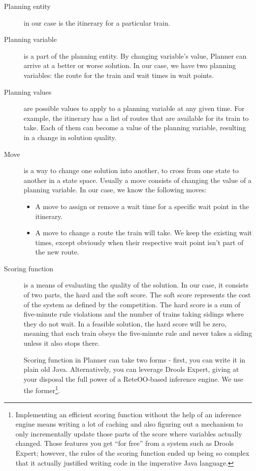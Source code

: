 \documentclass[10pt,a4paper,final]{article}
\begin{document}
\begin{description}
\item[Planning entity] in our case is the itinerary for a particular train.

\item[Planning variable] is a part of the planning entity. By changing variable's value, Planner can arrive at a better or worse solution. In our case, we have two planning variables: the route for the train and wait times in wait points.

\item[Planning values] are possible values to apply to a planning variable at any given time. For example, the itinerary has a list of routes that are available for its train to take. Each of them can become a value of the planning variable, resulting in a change in solution quality.

\item[Move] is a way to change one solution into another, to cross from one state to another in a state space. Usually a move consists of changing the value of a planning variable. In our case, we know the following moves:

\begin{itemize}
\item A move to assign or remove a wait time for a specific wait point in the itinerary.
\item A move to change a route the train will take. We keep the existing wait times, except obviously when their respective wait point isn't part of the new route.
\end{itemize}

\item[Scoring function] is a means of evaluating the quality of the solution. In our case, it consists of two parts, the hard and the soft score. The soft score represents the cost of the system as defined by the competition. The hard score is a sum of five-minute rule violations and the number of trains taking sidings where they do not wait. In a feasible solution, the hard score will be zero, meaning that each train obeys the five-minute rule and never takes a siding unless it also stops there.

Scoring function in Planner can take two forms - first, you can write it in plain old Java. Alternatively, you can leverage Drools Expert, giving at your disposal the full power of a ReteOO-based inference engine. We use the former\footnote{Implementing an efficient scoring function without the help of an inference engine means writing a lot of caching and also figuring out a mechanism to only incrementally update those parts of the score where variables actually changed. Those features you get ``for free'' from a system such as Drools Expert; however, the rules of the scoring function ended up being so complex that it actually justified writing code in the imperative Java language.}.

\end{description}
\end{document}
